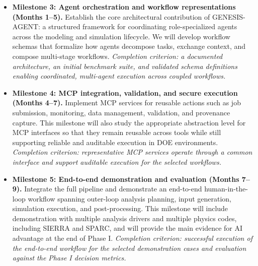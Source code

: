 \documentclass[11pt]{article} \usepackage[margin=1in]{geometry}
\begin{document}
\begin{itemize}[leftmargin=1.2em,itemsep=0.2em,topsep=0.2em]
\item \textbf{Milestone 3: Agent orchestration and workflow representations
(Months 1--5).} Establish the core architectural contribution of
GENESIS-AGENT: a structured framework for coordinating role-specialized agents
across the modeling and simulation lifecycle. We will develop workflow schemas
that formalize how agents decompose tasks, exchange context, and compose
multi-stage workflows. \textit{Completion criterion: a documented architecture, an initial
benchmark suite, and validated schema definitions enabling coordinated,
multi-agent execution across coupled workflows.}


\item \textbf{Milestone 4: MCP integration, validation, and secure execution
(Months 4--7).} Implement MCP services for reusable actions such as job
submission, monitoring, data management, validation, and provenance capture.
This milestone will also study the appropriate abstraction level for MCP
interfaces so that they remain reusable across tools while still supporting
reliable and auditable execution in DOE environments. \textit{Completion
criterion: representative MCP services operate through a common interface and
support auditable execution for the selected workflows.}

\item \textbf{Milestone 5: End-to-end demonstration and evaluation (Months
7--9).} Integrate the full pipeline and demonstrate an end-to-end
human-in-the-loop workflow spanning outer-loop analysis planning, input
generation, simulation execution, and post-processing. This milestone will
include demonstration with multiple analysis drivers and multiple physics
codes, including SIERRA and SPARC, and will provide the main evidence for AI
advantage at the end of Phase I. \textit{Completion criterion: successful
execution of the end-to-end workflow for the selected demonstration cases and
evaluation against the Phase I decision metrics.}
\end{itemize}
\end{document}
